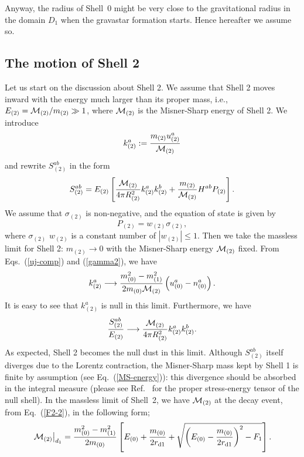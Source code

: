\documentclass[aps,preprint,preprintnumber,nofootinbib,amsmath,amssymb,ascmac,bm,12pt]{revtex4}
\newcommand{\rdo}{r_{\rm d1}}
\newcommand{\mz}{m_{(0)}}
\newcommand{\mo}{m_{(1)}}
\newcommand{\mt}{m_{(2)}}
\newcommand{\Eze}{E_{(0)}}
\begin{document}
Anyway, the radius of Shell~0 might be very close 
to the gravitational radius in the domain $D_1$ when the gravastar formation starts. Hence hereafter 
we assume so.


\subsection{The motion of Shell 2}

Let us start on the discussion about Shell 2. We assume that Shell 2 moves inward 
with the energy much larger than its proper mass, i.e., $E_{(2)}={\cal M}_{(2)}/m_{(2)}\gg1$, 
where ${\cal M}_{(2)}$ is the Misner-Sharp energy of Shell 2. 
We introduce 
\begin{equation}
k_{(2)}^a:=\frac{\mt u_{(2)}^a}{{\cal M}_{(2)}}
\end{equation}
and rewrite $S_{(2)}^{ab}$ in the form
\begin{align}
S_{(2)}^{ab}=E_{(2)}\left[\frac{{\cal M}_{(2)}}{4\pi R_{(2)}^2}k_{(2)}^a k_{(2)}^b +\frac{\mt}{{\cal M}_{(2)}}H^{ab}P_{(2)}\right]. 
\end{align}
We assume that $\sigma_{(2)}$ is non-negative, and the equation of state is given by  
$$
P_{(2)}=w_{(2)}\sigma_{(2)},
$$ 
where $\sigma_{(2)}$ $w_{(2)}$ is a constant number of $\left|w_{(2)}\right|\leq1$. 
Then we take the massless limit for Shell 2: $\mt\rightarrow 0$ with the Misner-Sharp energy ${\cal M}_{(2)}$ 
fixed. From Eqs.~(\ref{uj-comp}) and (\ref{gamma2}), we have 
\begin{equation}
k_{(2)}^a\longrightarrow \frac{\mz^2-\mo^2}{2\mz{\cal M}_{(2)}}\left(u_{(0)}^a-n_{(0)}^a\right).
\end{equation}
It is easy to see that $k_{(2)}^a$ is null in this limit. Furthermore, we have
\begin{equation}
\frac{S_{(2)}^{ab}}{E_{(2)}}\longrightarrow \frac{{\cal M}_{(2)}}{4\pi R_{(2)}^2}k_{(2)}^a k_{(2)}^b.  
\end{equation}
As expected, Shell 2 becomes the null dust in this limit. 
Although $S^{ab}_{(2)}$ itself diverges due to the Lorentz contraction, the Misner-Sharp mass 
kept by Shell 1 is finite by assumption (see Eq.~(\ref{MS-energy})): this divergence should be absorbed 
in the integral measure (please see Ref.~\cite{Poisson} for the proper stress-energy tensor of the null shell). 
In the massless limit of Shell~2, we have ${\cal M}_{(2)}$ at the decay event, from Eq.~(\ref{F2-2}), in   
the following form;
\begin{align}
\left. {\cal M}_{(2)}\right|_{d_1}= \frac{\mz^2-\mo^2}{2\mz}\left[\Eze+\frac{\mz}{2\rdo}
+\sqrt{\left(\Eze-\frac{\mz}{2\rdo}\right)^2-F_1}\right]. \label{calM2}
\end{align}
\end{document}
